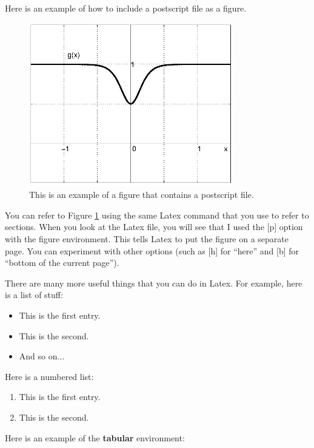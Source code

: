 \documentclass[11pt]{article}
\begin{document}
Here is an example of how to include a postscript file as a figure.
\begin{figure}[p]
\centerline{\includegraphics[width=3.5in]{myfile.jpg}}
\caption{This is an example of a figure that contains a postscript file.}
\label{FIG}
\end{figure}
You can refer to Figure \ref{FIG} using the same Latex command
that you use to refer to sections.
When you look at the Latex file, you will see that I used the
[p] option with the figure environment.  This tells Latex to
put the figure on a separate page.
You can experiment with other options (such as [h] for ``here''
and [b] for ``bottom of the current page'').

There are many more useful things that you can do in Latex.  For example,
here is a list of stuff:
\begin{itemize}
\item This is the first entry.
\item This is the second.
\item And so on...
\end{itemize}
Here is a numbered list:
\begin{enumerate}
\item This is the first entry.
\item This is the second.
\end{enumerate}

Here is an example of the \textbf{tabular} environment:
\end{document}
